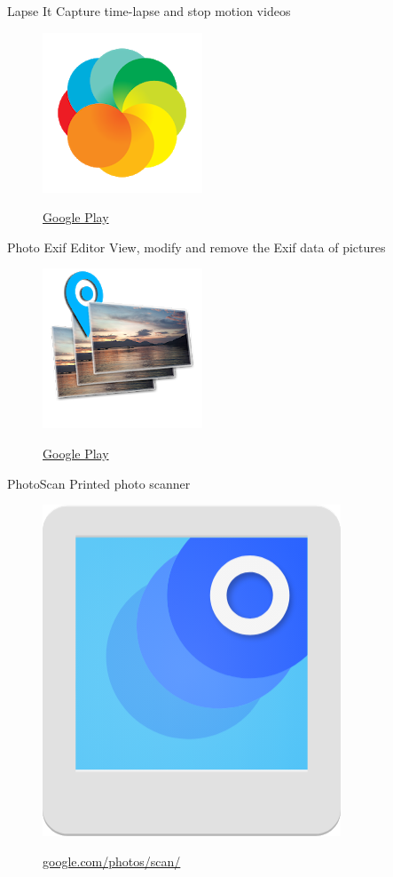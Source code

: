 \documentclass[serif,14pt,color=usenames,dvipsnames]{beamer}
\begin{document}
\begin{frame}{Lapse It}
Capture time-lapse and stop motion videos

  \begin{figure}
  \centering
  \includegraphics[width=0.4\linewidth]{imgs/lapseit}

  \href{https://play.google.com/store/apps/details?id=com.ui.LapseIt}{Google
  Play }
  \end{figure}
\end{frame}

\begin{frame}{Photo Exif Editor}
View, modify and remove the Exif data of pictures

  \begin{figure}
  \centering
  \includegraphics[width=0.3\linewidth]{imgs/peep}

  \href{https://play.google.com/store/apps/details?id=net.xnano.android.photoexifeditor}{Google
  Play }
  \end{figure}
\end{frame}

\begin{frame}{PhotoScan}
  Printed photo scanner

  \begin{figure}
  \centering
  \includegraphics[width=0.3\linewidth]{imgs/photoscan2}

  \href{https://google.com/photos/scan/}{google.com/photos/scan/}
  \end{figure}
\end{frame}
\end{document}
